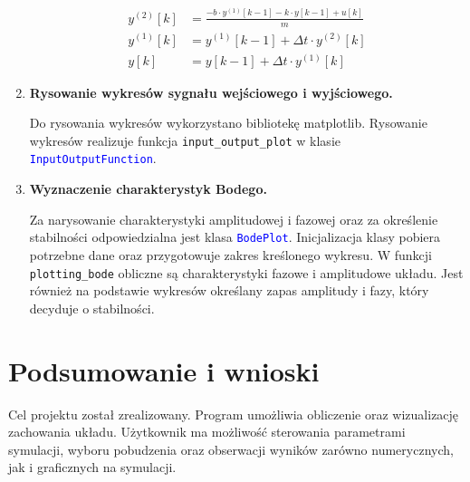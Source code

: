 \documentclass[10pt, a4paper]{article}
\begin{document}
\begin{enumerate}[label=\alph*.]
{\footnotesize
\begin{align*}
y^{(2)}[k] &= \frac{- b \cdot y^{(1)}[k-1] -k \cdot y[k-1] + u[k]}{m} \\
y^{(1)}[k] &= y^{(1)}[k-1] + \Delta t \cdot y^{(2)}[k] \\
y[k] &= y[k-1] + \Delta t \cdot y^{(1)}[k]
\end{align*}
}



  \vspace{0.2cm}

  \item \textbf{Rysowanie wykresów sygnału wejściowego i wyjściowego.} \par\vspace{0.1cm}
  Do rysowania wykresów wykorzystano bibliotekę matplotlib. 
  Rysowanie wykresów realizuje funkcja {\texttt{input\_output\_plot}}
  w klasie \textcolor{blue}{\texttt{InputOutputFunction}}.

  \vspace{0.2cm}
  
  \item \textbf{Wyznaczenie charakterystyk Bodego.} \par\vspace{0.1cm}
    Za narysowanie charakterystyki amplitudowej i fazowej oraz za określenie stabilności
    odpowiedzialna jest klasa \textcolor{blue}{\texttt{BodePlot}}. Inicjalizacja klasy pobiera potrzebne dane
    oraz przygotowuje zakres kreślonego wykresu. W funkcji {\texttt{plotting\_bode}} obliczne są charakterystyki fazowe i amplitudowe
    układu. Jest również na podstawie wykresów określany zapas amplitudy i fazy, który decyduje o stabilności.
  \vspace{0.2cm}

\end{enumerate}


\section{Podsumowanie i wnioski}

Cel projektu został zrealizowany. Program umożliwia obliczenie oraz wizualizację zachowania układu. Użytkownik ma możliwość sterowania parametrami symulacji, wyboru pobudzenia oraz obserwacji wyników zarówno numerycznych, jak i graficznych na symulacji.
\end{document}
